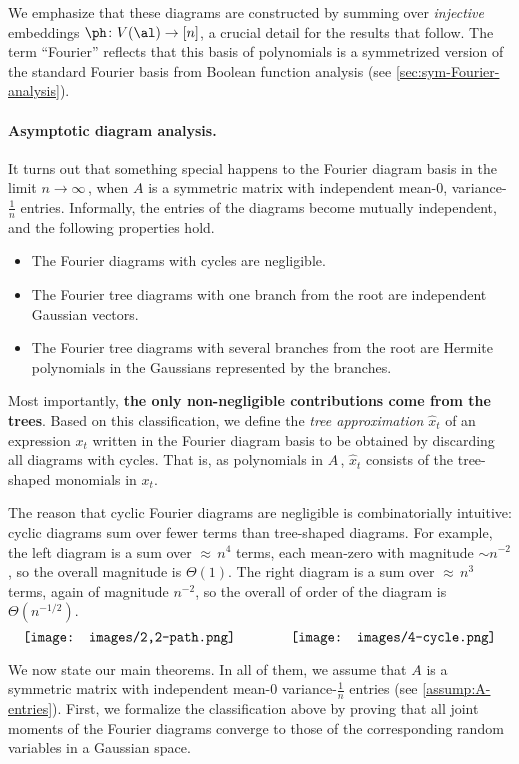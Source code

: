 \documentclass[12pt]{article}
\begin{document}
We emphasize that these diagrams are
constructed by summing over {\em injective} embeddings $\ph\colon V(\al)\to[n]$, a crucial detail for the
results that follow. The term ``Fourier'' reflects that
this basis of polynomials is a symmetrized version of the
standard Fourier basis from Boolean function analysis (see \cref{sec:sym-Fourier-analysis}).


\vspace{-8pt}
\paragraph{Asymptotic diagram analysis.}
It turns out that something special happens to the
Fourier diagram basis in the limit $n\to\infty\,$, when
$A$ is a symmetric matrix with independent
mean-0, variance-$\frac 1 n$ entries. Informally, the entries of the diagrams become mutually independent, and the following properties hold.
\begin{itemize}
    \item The Fourier diagrams with cycles are negligible.
    \item The Fourier tree diagrams with one branch from the root are independent Gaussian vectors.
    \item The Fourier tree diagrams with several branches from the root are Hermite polynomials in the Gaussians represented by the branches.
\end{itemize}
Most importantly, \textbf{the only non-negligible contributions come from the trees}.
Based on this classification, we define the
{\em tree approximation} $\widehat x_t$ of an expression $x_t$ written
in the Fourier diagram basis to be obtained by discarding all diagrams with cycles.
That is, as polynomials in $A\,$, $\widehat x_t$ consists of the tree-shaped monomials in $x_t$.


The reason that cyclic Fourier diagrams are negligible is combinatorially intuitive:
cyclic diagrams sum over fewer terms than tree-shaped diagrams.
For example, the left diagram is a sum over ${\displaystyle\approx }\,n^4$ terms, each mean-zero with magnitude $\sim n^{-2}$, so the overall magnitude is $\Theta(1)$. The right diagram is a sum over ${\displaystyle\approx }\,n^3$ terms, again of magnitude $n^{-2}$, so the overall of order of the diagram is $\Theta(n^{-1/2})$.
\[    \vcenter{\hbox{\texttt{[image: images/2,2-path.png]}}} \qquad \qquad \vcenter{\hbox{\texttt{[image: images/4-cycle.png]}}}
\]

We now state our main theorems. In all of them, we assume that $A$ is a symmetric matrix with independent mean-0 variance-$\frac 1n$ entries (see \cref{assump:A-entries}). First, we formalize the classification above by proving that all joint moments of the Fourier diagrams converge to those of the corresponding random variables in a Gaussian space.
\end{document}
